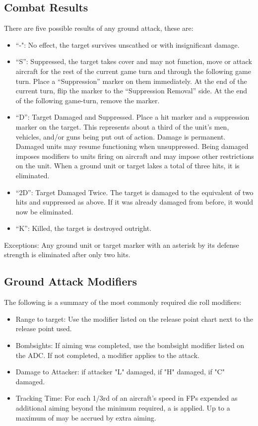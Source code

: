 \subsection{Combat Results} There are five possible results of any ground attack, these are:
\begin{itemize}
\item “-": No effect, the target survives unscathed or with insignificant damage.
\item “S”: Suppressed, the target takes cover and may not function, move or attack aircraft for the rest of the current game turn and through the following game turn. Place a “Suppression” marker on them immediately. At the end of the current turn, flip the marker to the “Suppression Removal” side. At the end of the following game-turn, remove the marker.
\item “D”: Target Damaged and Suppressed. Place a hit marker and a suppression marker on the target. This represents about a third of the unit's men, vehicles, and/or guns being put out of action. Damage is permanent. Damaged units may resume functioning when unsuppressed. Being damaged imposes modifiers to units firing on aircraft and may impose other restrictions on the unit. When a ground unit or target lakes a total of three hits, it is eliminated.
\item “2D”: Target Damaged Twice. The target is damaged to the equivalent of two hits and suppressed as above. If it was already damaged from before, it would now be eliminated.
\item “K”: Killed, the target is destroyed outright.
\end{itemize}

Exceptions:  Any ground unit or target marker with an asterisk by its defense strength is eliminated after only two hits.

\subsection{Ground Attack Modifiers} The following is a summary of the most commonly required die roll modifiers:
\begin{itemize}
\item Range to target: Use the modifier listed on the release point chart next to the release point used.
\item Bombsights: If aiming was completed, use the bombsight modifier listed on the ADC. If not completed, a  modifier applies to the attack.
\item Damage to Attacker:  if attacker "L" damaged,  if "H" damaged,  if "C" damaged.
\item Tracking Time: For each 1/3rd of an aircraft's speed in FPs expended as additional aiming beyond the minimum required, a  is applied. Up to a maximum of  may be accrued by extra aiming.
\end{itemize}

